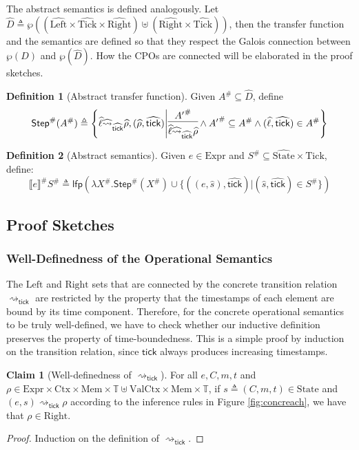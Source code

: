 \documentclass{article}
\theoremstyle{definition}
\newtheorem{definition}{Definition}[section]
\newtheorem{clm}{Claim}[section]
\newcommand*{\A}[1]{\widehat{#1}}
\newcommand*{\Abs}[1]{{#1}^{\#}}
\newcommand*{\Expr}{\text{Expr}}
\newcommand*{\Time}{\mathbb{T}}
\newcommand*{\Ctx}{\text{Ctx}}
\newcommand*{\Value}{\text{Val}}
\newcommand*{\Mem}{\text{Mem}}
\newcommand*{\Left}{\text{Left}}
\newcommand*{\Right}{\text{Right}}
\newcommand*{\mem}{m}
\newcommand*{\State}{\text{State}}
\newcommand*{\Tick}{\text{Tick}}
\newcommand*{\semarrow}{\rightsquigarrow}
\newcommand*{\sembracket}[1]{\lBrack{#1}\rBrack}
\newcommand*{\tick}{\mathsf{tick}}
\begin{document}
The abstract semantics is defined analogously.
Let $\A{D}\triangleq\wp((\A\Left\times\A\Tick\times\A\Right )\uplus(\A\Right\times\A\Tick))$, then the transfer function and the semantics are defined so that they respect the Galois connection between $\wp(D)$ and $\wp(\A{D})$.
How the CPOs are connected will be elaborated in the proof sketches.

\begin{definition}[Abstract transfer function]
  Given $\Abs{A}\subseteq\A{D}$, define
  \[
    \Abs{\mathsf{Step}}(\Abs{A})\triangleq
    \left\{\A\ell\A\semarrow_{\A\tick}\A\rho, (\A\rho,\A\tick)\middle|
    \begin{prooftree}[center=true]
      \hypo{\Abs{A'}}\infer1{\A\ell\A\semarrow_{\A\tick}\A\rho}
    \end{prooftree}\wedge
    \Abs{A'}\subseteq \Abs{A}\wedge(\A\ell,\A\tick)\in \Abs{A}
    \right\}
  \]
\end{definition}
\begin{definition}[Abstract semantics]
  Given $e\in\Expr$ and $\Abs{S}\subseteq\A\State\times\A\Tick$, define:
  \[
    \Abs{\sembracket{e}}\Abs{S}\triangleq\mathsf{lfp}(\lambda \Abs{X}.\Abs{\mathsf{Step}}(\Abs{X})\cup\{((e,\A{s}),\A\tick)|(\A{s},\A\tick)\in \Abs{S}\})
  \]
\end{definition}

\clearpage
\subsection{Proof Sketches}
\subsubsection{Well-Definedness of the Operational Semantics}

The $\Left$ and $\Right$ sets that are connected by the concrete transition relation $\semarrow_{\tick}$ are restricted by the property that the timestamps of each element are bound by its time component.
Therefore, for the concrete operational semantics to be truly well-defined, we have to check whether our inductive definition preserves the property of time-boundedness.
This is a simple proof by induction on the transition relation, since $\tick$ always produces increasing timestamps.

\begin{clm}[Well-definedness of $\semarrow_{\tick}$]
  For all $e,C,\mem,t$ and $\rho\in\Expr\times\Ctx\times\Mem\times\Time\uplus\Value\Ctx\times\Mem\times\Time$, if $s\triangleq(C,\mem,t)\in\State$ and
  $(e,s)\semarrow_{\tick}\rho$ according to the inference rules in Figure \ref{fig:concreach}, we have that $\rho\in\Right$.
\end{clm}
\begin{proof}
  Induction on the definition of $\semarrow_\tick$.
\end{proof}
\end{document}
